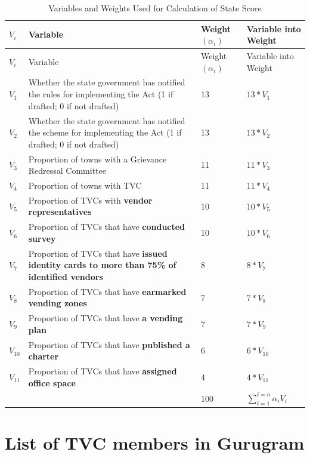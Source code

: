 \documentclass[a4paper, 12pt, twoside, table]{article}
\begin{document}
{{%
\begin{longtable}[l]{>{\raggedright}p{1.5cm}>{\raggedright}p{6cm}>{\raggedright}p{2.5cm}>{\raggedright\arraybackslash}p{4cm}}
  \caption{Variables and Weights Used for Calculation of State Score}\\
    \toprule
$V_i$ & Variable & Weight $(\alpha_i)$ & Variable into Weight \\
\midrule
\endfirsthead
$V_i$ & Variable & Weight $(\alpha_i)$ & Variable into Weight \\
\midrule
\endhead
\bottomrule
\endfoot
\bottomrule
\endlastfoot
$V_1$ & Whether the state government has notified the rules for implementing the Act (1 if drafted; 0 if not drafted) & 13 & $13 * V_1$\\
$V_2$ & Whether the state government has notified the scheme for implementing the Act (1 if drafted; 0 if not drafted) & 13 & $13 * V_2$\\
$V_3$ & Proportion of towns with a Grievance Redressal Committee & 11 & $11 * V_3$\\
$V_4$ & Proportion of towns with TVC & 11 & $11 * V_4$\\
$V_5$ & Proportion of TVCs with \textbf{vendor representatives} & 10 & $10 * V_5$\\
$V_6$ & Proportion of TVCs that have \textbf{conducted survey} & 10 & $10 * V_6$\\
$V_7$ & Proportion of TVCs that have \textbf{issued identity cards to more than 75\% of identified vendors} & 8 & $8 * V_7$\\
$V_8$ & Proportion of TVCs that have \textbf{earmarked vending zones} & 7 & $7 * V_8$\\
$V_9$ & Proportion of TVCs that have \textbf{a vending plan} & 7 & $7 * V_9$\\
$V_{10}$ & Proportion of TVCs that have \textbf{published a charter} & 6 & $6 * V_{10}$\\
$V_{11}$ & Proportion of TVCs that have \textbf{assigned office space} & 4 & $4 * V_{11}$\\
\midrule
& & 100 & $\sum_{i = 1}^{i = n} \alpha_i V_i$\\
\end{longtable}




\newpage
\section{List of TVC members in Gurugram}
\label{appendix: TVC members}
}}
\end{document}
